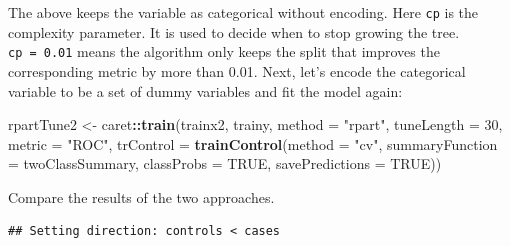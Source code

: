 \documentclass[12pt,]{krantz}
\makeatletter
\newenvironment{Shaded}{\begin{snugshade}}{\end{snugshade}}
\newcommand{\DataTypeTok}[1]{\textcolor[rgb]{0.27,0.27,0.27}{#1}}
\newcommand{\DecValTok}[1]{\textcolor[rgb]{0.06,0.06,0.06}{#1}}
\newcommand{\KeywordTok}[1]{\textcolor[rgb]{0.27,0.27,0.27}{\textbf{#1}}}
\newcommand{\NormalTok}[1]{#1}
\newcommand{\OperatorTok}[1]{\textcolor[rgb]{0.43,0.43,0.43}{\textbf{#1}}}
\newcommand{\OtherTok}[1]{\textcolor[rgb]{0.37,0.37,0.37}{#1}}
\newcommand{\StringTok}[1]{\textcolor[rgb]{0.5,0.5,0.5}{#1}}
\newenvironment{kframe}{%
\medskip{}
\setlength{\fboxsep}{.8em}
 \def\at@end@of@kframe{}%
 \ifinner\ifhmode%
  \def\at@end@of@kframe{\end{minipage}}%
  \begin{minipage}{\columnwidth}%
 \fi\fi%
 \def\FrameCommand##1{\hskip\@totalleftmargin \hskip-\fboxsep
 \colorbox{shadecolor}{##1}\hskip-\fboxsep
     \hskip-\linewidth \hskip-\@totalleftmargin \hskip\columnwidth}%
 \MakeFramed {\advance\hsize-\width
   \@totalleftmargin\z@ \linewidth\hsize
   \@setminipage}}%
 {\par\unskip\endMakeFramed%
 \at@end@of@kframe}
\renewenvironment{Shaded}{\begin{kframe}}{\end{kframe}}
\makeatother
\begin{document}
The above keeps the variable as categorical without encoding. Here \texttt{cp} is the complexity parameter. It is used to decide when to stop growing the tree. \texttt{cp\ =\ 0.01} means the algorithm only keeps the split that improves the corresponding metric by more than 0.01. Next, let's encode the categorical variable to be a set of dummy variables and fit the model again:

\begin{Shaded}
\begin{Highlighting}[]
\NormalTok{rpartTune2 <-}\StringTok{ }\NormalTok{caret}\OperatorTok{::}\KeywordTok{train}\NormalTok{(trainx2, trainy, }\DataTypeTok{method =} \StringTok{"rpart"}\NormalTok{,}
                       \DataTypeTok{tuneLength =} \DecValTok{30}\NormalTok{,}
                       \DataTypeTok{metric =} \StringTok{"ROC"}\NormalTok{, }
                       \DataTypeTok{trControl =} \KeywordTok{trainControl}\NormalTok{(}\DataTypeTok{method =} \StringTok{"cv"}\NormalTok{,}
                                                \DataTypeTok{summaryFunction =}\NormalTok{ twoClassSummary,}
                                                \DataTypeTok{classProbs =} \OtherTok{TRUE}\NormalTok{,}
                                                \DataTypeTok{savePredictions =} \OtherTok{TRUE}\NormalTok{))}
\end{Highlighting}
\end{Shaded}

Compare the results of the two approaches.

\begin{Shaded}
\end{Shaded}

\begin{verbatim}
## Setting direction: controls < cases
\end{verbatim}

\begin{Shaded}
\end{Shaded}
\end{document}

